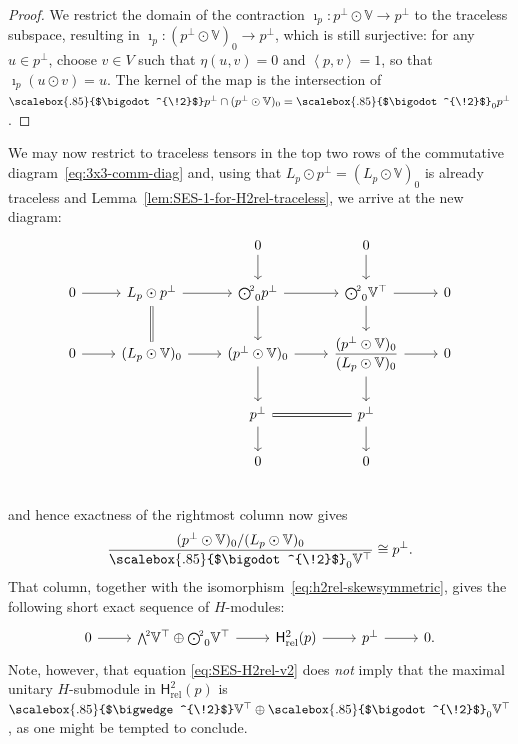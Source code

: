 \documentclass[11pt,reqno,a4paper,final]{amsart}
\newcommand\ext[1]{\scalebox{.85}{$\bigwedge^{\!#1}$}}
\newcommand\sym[1]{\scalebox{.85}{$\bigodot^{\!#1}$}}
\theoremstyle{plain}
\theoremstyle{definition}
\newcommand{\Hrel}{\mathsf{H}_{\mathrm{rel}}}
\newcommand{\VV}{\mathbb{V}}
\newcommand{\1}{\mathbb{1}}
\numberwithin{equation}{section}
\begin{document}
\begin{proof}
  We restrict the domain of the contraction $\imath_p \colon p^\perp \odot \VV \to
  p^\perp$ to the traceless subspace, resulting in $\imath_p \colon
  (p^\perp \odot \VV)_0 \to p^\perp$, which is still surjective: for any $u
  \in p^\perp$, choose $v \in V$ such that $\eta(u,v) = 0$ and
  $\left<p,v\right> =1$, so that $\imath_p (u \odot v) = u$.  The
  kernel of the map is the intersection of $\sym{2}p^\perp \cap
  (p^\perp \odot \VV)_0 = \sym{2}_0 p^\perp$.
\end{proof}


We may now restrict to traceless tensors in the top two rows of the
commutative diagram~\eqref{eq:3x3-comm-diag} and, using that $L_p
\odot p^\perp = (L_p \odot \VV)_0$ is already traceless and
Lemma~\ref{lem:SES-1-for-H2rel-traceless}, we arrive at the new diagram:
\begin{equation}
  \begin{tikzcd}
    & & 0 \arrow[d] & 0 \arrow[d] & \\
    0 \arrow[r] & L_p \odot p^\perp \arrow[d, equal] \arrow[r] & \sym{2}_0 p^\perp \arrow[r] \arrow[d] & \sym{2}_0 \VV^\top \arrow[r] \arrow[d] & 0\\
    0 \arrow[r] & (L_p \odot \VV)_0 \arrow[r] & (p^\perp \odot \VV)_0 \arrow[r] \arrow[d] & \dfrac{(p^\perp \odot \VV)_0}{(L_p \odot \VV)_0} \arrow[r] \arrow[d] & 0\\
    & & p^\perp \arrow[r, equal] \arrow[d] & p^\perp \arrow[d] & \\
    & & 0 & 0 &\\
  \end{tikzcd}
\end{equation}
and hence exactness of the rightmost column now gives
\begin{equation}
  \dfrac{(p^\perp \odot \VV)_0/(L_p \odot \VV)_0}{\sym{2}_0\VV^\top}  \cong p^\perp.
\end{equation}
That column, together with the
isomorphism~\eqref{eq:h2rel-skewsymmetric}, gives the following short
exact sequence of $H$-modules:
\begin{equation}
  \label{eq:SES-H2rel-v2}
  \begin{tikzcd}
    0 \arrow[r] & \ext{2}\VV^\top \oplus \sym{2}_0 \VV^\top \arrow[r] & \Hrel^2(p) \arrow[r] & p^\perp \arrow[r] & 0.
  \end{tikzcd}
\end{equation}
Note, however, that equation \eqref{eq:SES-H2rel-v2} does \emph{not}
imply that the maximal unitary $H$-submodule in $\Hrel^2(p)$ is
$\ext{2}\VV^\top \oplus \sym{2}_0 \VV^\top$, as one might be tempted
to conclude.
\end{document}
